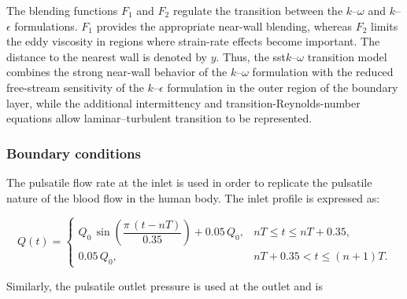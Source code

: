 \documentclass[12pt,a4paper]{article}
\newcommand{\SST}{\ac{sst}\xspace}
\theoremstyle{definition}
\numberwithin{equation}{section}
\providecommand{\DIFaddbegin}{} %
\providecommand{\DIFaddend}{} %
\providecommand{\DIFdelbegin}{} %
\providecommand{\DIFdelend}{} %
\newcommand{\DIFscaledelfig}{0.5}
\newlength{\DIFdelgraphicswidth} %
\newlength{\DIFdelgraphicsheight} %
\newcommand{\DIFaddincludegraphics}[2][]{{\color{blue}\fbox{\DIFOincludegraphics[#1]{#2}}}} %
\newcommand{\DIFdelincludegraphics}[2][]{%
\sbox{\DIFdelgraphicsbox}{\DIFOincludegraphics[#1]{#2}}%
\settoboxwidth{\DIFdelgraphicswidth}{\DIFdelgraphicsbox} %
\settoboxtotalheight{\DIFdelgraphicsheight}{\DIFdelgraphicsbox} %
\scalebox{\DIFscaledelfig}{%
\parbox[b]{\DIFdelgraphicswidth}{\usebox{\DIFdelgraphicsbox}\\[-\baselineskip] \rule{\DIFdelgraphicswidth}{0em}}\llap{\resizebox{\DIFdelgraphicswidth}{\DIFdelgraphicsheight}{%
\setlength{\unitlength}{\DIFdelgraphicswidth}%
\begin{picture}(1,1)%
\thicklines\linethickness{2pt} %
{\color[rgb]{1,0,0}\put(0,0){\framebox(1,1){}}}%
{\color[rgb]{1,0,0}\put(0,0){\line( 1,1){1}}}%
{\color[rgb]{1,0,0}\put(0,1){\line(1,-1){1}}}%
\end{picture}%
}\hspace*{3pt}}} %
} %
\DeclareRobustCommand{\DIFaddbegin}{\DIFOaddbegin \let\includegraphics\DIFaddincludegraphics} %
\DeclareRobustCommand{\DIFaddend}{\DIFOaddend \let\includegraphics\DIFOincludegraphics} %
\DeclareRobustCommand{\DIFdelbegin}{\DIFOdelbegin \let\includegraphics\DIFdelincludegraphics} %
\DeclareRobustCommand{\DIFdelend}{\DIFOaddend \let\includegraphics\DIFOincludegraphics} %
\renewcommand{\DIFaddincludegraphics}[2][]{\DIFOincludegraphics[#1]{#2}}
\renewcommand{\DIFdelincludegraphics}[2][]{}
\def\DIFaddbegin{}\def\DIFaddend{}%
\def\DIFdelbegin{}\def\DIFdelend{}%
\begin{document}
The blending functions \(F_1\) and \(F_2\) regulate the transition between the \(k\)--\(\omega\) and \(k\)--\(\epsilon\) formulations. \(F_1\) provides the appropriate near-wall blending, whereas \(F_2\) limits the eddy viscosity in regions where strain-rate effects become important. The distance to the nearest wall is denoted by \(y\). Thus, the \SST \(k\)--\(\omega\) transition model combines the strong near-wall behavior of the \(k\)--\(\omega\) formulation with the reduced free-stream sensitivity of the \(k\)--\(\epsilon\) formulation in the outer region of the boundary layer, while the additional intermittency and transition-Reynolds-number equations allow laminar--turbulent transition to be represented.




\subsubsection{Boundary conditions}
The pulsatile flow rate at the inlet is used in order to replicate the pulsatile nature of the blood flow in the human body. The inlet profile is expressed as:

\DIFdelbegin %
\DIFdelend \DIFaddbegin \begin{equation}
Q(t)=
\begin{cases}
Q_0\,\sin\!\left(\dfrac{\pi\,(t-nT)}{0.35}\right)+0.05\,Q_0,
& nT \le t \le nT+0.35, \\[6pt]
0.05\,Q_0,
& nT+0.35 < t \le (n+1)T.
\end{cases}
\label{eq:inlet_waveform}
\end{equation}\DIFaddend 


Similarly, the pulsatile outlet pressure is used at the outlet and is
\end{document}
